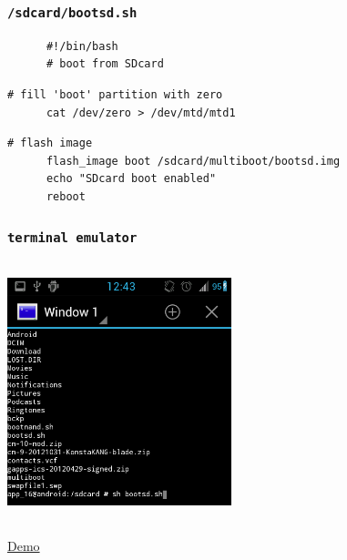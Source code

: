 \documentclass{beamer}
\begin{document}
\begin{frame}[fragile]
  \frametitle{\texttt{/sdcard/bootsd.sh}}
  \begin{semiverbatim}
    \pause
    \begin{lstlisting}
      #!/bin/bash
      # boot from SDcard
    \end{lstlisting}

    \pause
    \begin{lstlisting}[firstnumber=last]
      # fill 'boot' partition with zero
      cat /dev/zero > /dev/mtd/mtd1
    \end{lstlisting}

    \pause
    \begin{lstlisting}[firstnumber=last]
      # flash image
      flash_image boot /sdcard/multiboot/bootsd.img
      echo "SDcard boot enabled"
      reboot
    \end{lstlisting}

  \end{semiverbatim}
\end{frame}
\begin{frame}
\frametitle{\tt{terminal emulator}}
\begin{center} 
  \includegraphics[width=6.5cm,height=7.5cm]{em2_cropd.png} 
\end{center} 
\end{frame}
\begin{frame}{}
  \begin{block}{}
    \centerline{}
    \centerline{}
    \centerline{\href{file:///home/sachin/Videos/fossin/final.AVI}{Demo}}
    \centerline{}
    \centerline{}
  \end{block}
\end{frame}
%
% 
\end{document}
